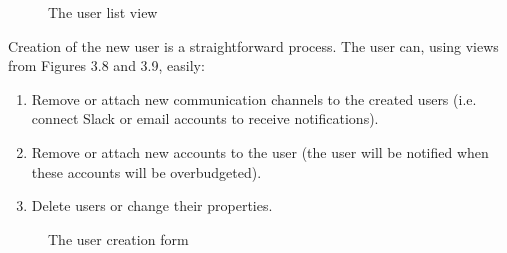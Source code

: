 \documentclass[licencjacka,en]{thesisclass}
\begin{document}
    \begin{figure}[H]
      \caption{The user list view\label{fig:scr-user-browse}}
    \end{figure}

    Creation of the new user is a straightforward process.
    The user can, using views from Figures 3.8 and 3.9, easily:
    \begin{enumerate}
        \item Remove or attach new communication channels
          to the created users (i.e. connect Slack or email accounts to receive notifications).
        \item Remove or attach new accounts to the user
          (the user will be notified when these accounts will be overbudgeted).
        \item Delete users or change their properties.
    \end{enumerate}

    \begin{figure}[H]
      \caption{The user creation form\label{fig:scr-user-create}}
    \end{figure}
\end{document}
